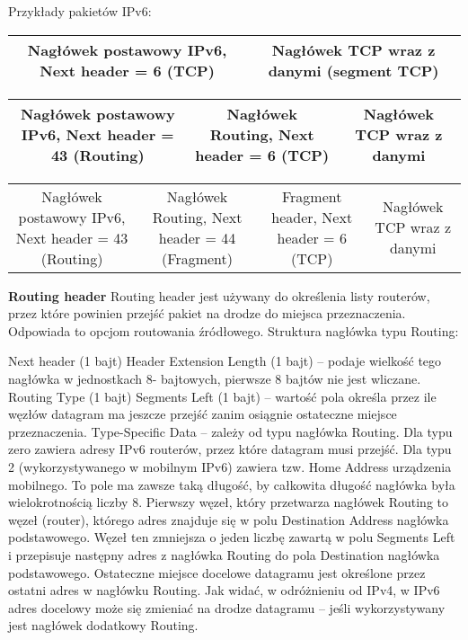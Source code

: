     Przykłady pakietów IPv6:

    \begin{tabular}{|c|c|}
        \hline
        Nagłówek
        postawowy
        IPv6,
        Next header =
        6 (TCP)
        &
        Nagłówek TCP
        wraz z danymi
        (segment TCP)\\
        \hline
    \end{tabular}

    \begin{tabular}{|c|c|c|}
        \hline
        Nagłówek
        postawowy
        IPv6,
        Next header =
        43 (Routing)
        &
        Nagłówek
        Routing,
        Next header =
        6 (TCP)
        &
        Nagłówek TCP
        wraz z danymi\\
        \hline
    \end{tabular}

    \begin{tabular}{|c|c|c|c|}
        \hline
        Nagłówek
        postawowy
        IPv6,
        Next header =
        43 (Routing)
        &
        Nagłówek
        Routing,
        Next header =
        44 (Fragment)
        &
        Fragment
        header,
        Next header =
        6 (TCP)
        &
        Nagłówek TCP
        wraz z danymi\\
    \end{tabular}


    \textbf{Routing header}
    Routing header jest używany do określenia listy routerów, przez które powinien przejść
    pakiet na drodze do miejsca przeznaczenia. Odpowiada to opcjom routowania źródłowego.
    Struktura nagłówka typu Routing:

    Next header (1 bajt)
    Header Extension Length (1 bajt) – podaje wielkość tego nagłówka w jednostkach 8-
    bajtowych, pierwsze 8 bajtów nie jest wliczane.
    Routing Type (1 bajt)
    Segments Left (1 bajt) – wartość pola określa przez ile węzłów datagram ma jeszcze przejść
    zanim osiągnie ostateczne miejsce przeznaczenia.
    Type-Specific Data – zależy od typu nagłówka Routing. Dla typu zero zawiera adresy IPv6
    routerów, przez które datagram musi przejść. Dla typu 2 (wykorzystywanego w mobilnym
    IPv6) zawiera tzw. Home Address urządzenia mobilnego. To pole ma zawsze taką długość, by
    całkowita długość nagłówka była wielokrotnością liczby 8.
    Pierwszy węzeł, który przetwarza nagłówek Routing to węzeł (router), którego adres
    znajduje się w polu Destination Address nagłówka podstawowego. Węzeł ten zmniejsza o
    jeden liczbę zawartą w polu Segments Left i przepisuje następny adres z nagłówka Routing
    do pola Destination nagłówka podstawowego. Ostateczne miejsce docelowe datagramu jest
    określone przez ostatni adres w nagłówku Routing. Jak widać, w odróżnieniu od IPv4, w IPv6
    adres docelowy może się zmieniać na drodze datagramu – jeśli wykorzystywany jest
    nagłówek dodatkowy Routing.


